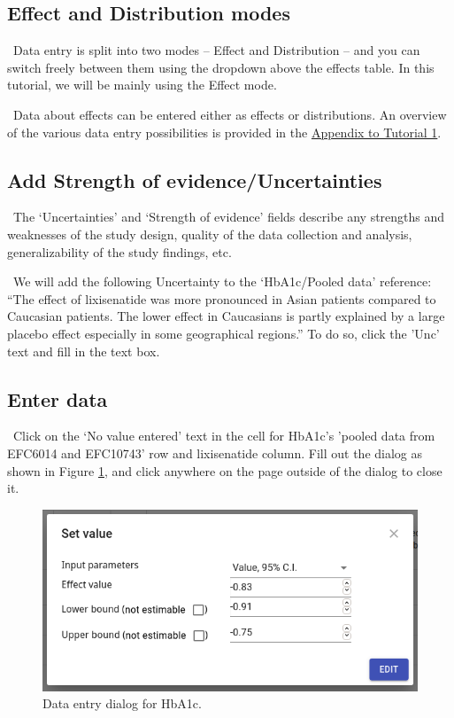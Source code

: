 \documentclass[00_mcda_tutorial.tex]{subfiles}
\begin{document}
\subsection*{Effect and Distribution modes}
\noindent \faLightbulbO \, Data entry is split into two modes – Effect and Distribution – and you can switch freely between them using the dropdown above the effects table. In this tutorial, we will be mainly using the Effect mode.
\newline

\noindent \faGraduationCap \, Data about effects can be entered either as effects or distributions. An overview of the various data entry possibilities is provided in the \hyperref[appendix1]{Appendix to Tutorial 1}.

\subsection*{Add Strength of evidence/Uncertainties}
\noindent \faGraduationCap \, The ‘Uncertainties’ and ‘Strength of evidence’ fields describe any strengths and weaknesses of the study design, quality of the data collection and analysis, generalizability of the study findings, etc.
\newline

\noindent \leftpointright \, We will add the following Uncertainty to the ‘HbA1c/Pooled data’ reference: “The effect of lixisenatide was more pronounced in Asian patients compared to Caucasian patients. The lower effect in Caucasians is partly explained by a large placebo effect especially in some geographical regions.” To do so, click the 'Unc' text and fill in the text box.

\subsection*{Enter data}
\noindent \leftpointright \, Click on the ‘No value entered’ text in the cell for HbA1c's 'pooled data from EFC6014 and EFC10743' row and lixisenatide column. Fill out the dialog as shown in Figure \ref{fig:data1}, and click anywhere on the page outside of the dialog to close it.

\begin{figure}[!ht]
    \centering
    \includegraphics[width=.5\textwidth]{fig/effectsInput.png}
    \caption{Data entry dialog for HbA1c.}
    \label{fig:data1}
\end{figure}
\end{document}
